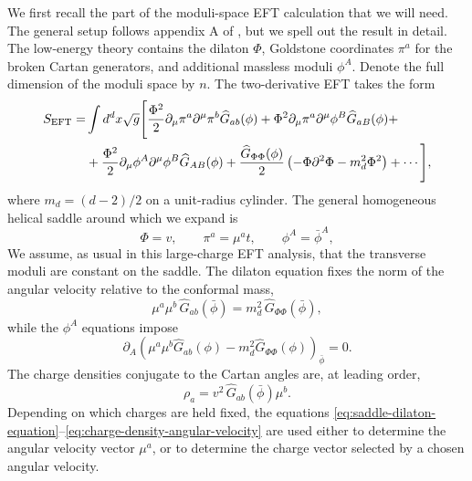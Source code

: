 \documentclass[a4paper,11pt]{article}
\begin{document}
We first recall the part of the moduli-space EFT calculation that we will need. The general setup follows appendix A of \cite{Cuomo:2024fuy}, but we spell out the result in detail. The low-energy theory contains the dilaton $\Phi$, Goldstone coordinates $\pi^a$ for the broken Cartan generators, and additional massless moduli $\phi^A$. Denote the full dimension of the moduli space by $n$. The two-derivative EFT takes the form
\begin{equation}\label{eq:crs-moduli-eft}
\begin{split}
S_{\rm EFT}=&
\int d^d x \sqrt{g}
\Bigg[
\frac{\Phi^2}{2}
\partial_\mu \pi^a \partial^\mu \pi^b
\widehat{G}_{ab}(\phi)
+\Phi^2
\partial_\mu \pi^a \partial^\mu \phi^B
\widehat{G}_{aB}(\phi)
+\\
&+
\frac{\Phi^2}{2}
\partial_\mu \phi^A \partial^\mu \phi^B
\widehat{G}_{AB}(\phi)+
\frac{\widehat{G}_{\Phi\Phi}(\phi)}{2}
\left(
-\Phi \partial^2 \Phi
- m_d^2 \Phi^2
\right)
+\cdots
\Bigg],
\end{split}
\end{equation}
where $m_d=(d-2)/2$ on a unit-radius cylinder. The general homogeneous helical saddle around which we expand is
\begin{equation}\label{eq:helical-saddle-general}
  \Phi=v, \qquad \pi^a=\mu^a t, \qquad \phi^A=\bar\phi^A ,
\end{equation}
We assume, as usual in this large-charge EFT analysis, that the transverse moduli are constant on the saddle. The dilaton equation fixes the norm of the angular velocity relative to the conformal mass,
\begin{equation}\label{eq:saddle-dilaton-equation}
  \mu^a \mu^b\, \widehat G_{ab}(\bar\phi) = m_d^2\,\widehat G_{\Phi\Phi}(\bar\phi),
\end{equation}
while the $\phi^A$ equations impose
\begin{equation}\label{eq:saddle-moduli-equation}
  \partial_A \left( \mu^a \mu^b\widehat G_{ab}(\phi) - m_d^2\widehat G_{\Phi\Phi}(\phi) \right)_{\bar\phi} = 0 .
\end{equation}
The charge densities conjugate to the Cartan angles are, at leading order,
\begin{equation}\label{eq:charge-density-angular-velocity}
  \rho_a = v^2\, \widehat G_{ab}(\bar\phi)\mu^b .
\end{equation}
Depending on which charges are held fixed, the equations \eqref{eq:saddle-dilaton-equation}--\eqref{eq:charge-density-angular-velocity} are used either to determine the angular velocity vector $\mu^a$, or to determine the charge vector selected by a chosen angular velocity.
\end{document}
